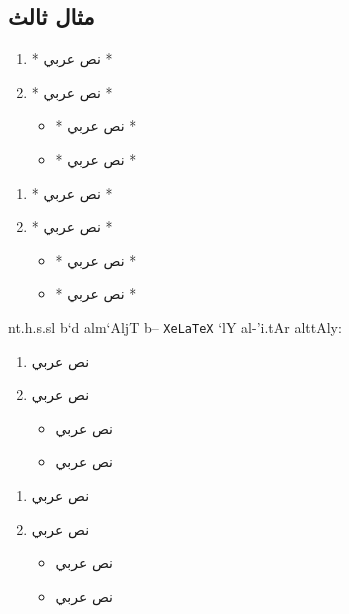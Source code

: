 \documentclass[8pt,a4paper]{article}
\begin{document}
\subsection*{مثال ثالث}
\begin{arab}
\begin{boxlis}
\begin{enumerate}
\item *\textarabic{\bantii
نص عربي }*
\item *\textarabic{\bantii
نص عربي }*
\begin{itemize}
\item *\textarabic{\bantii
نص عربي }*
\item *\textarabic{\bantii
نص عربي }*
\end{itemize}
\end{enumerate}
\begin{enumerate}
\item *\textarabic{\bantii
نص عربي }*
\item *\textarabic{\bantii
نص عربي }*
\begin{itemize}
\item *\textarabic{\bantii
نص عربي }*
\item *\textarabic{\bantii
نص عربي }*
\end{itemize}
\end{enumerate}
\end{boxlis}
nt.h.s.sl b`d alm`AljT b-- \texttt{XeLaTeX}
`lY al-'i.tAr alttAly:
\end{arab}
\begin{enumerate}
\item 
نص عربي 
\item 
نص عربي
\begin{itemize}
\item 
نص عربي
\item 
نص عربي 
\end{itemize}
\end{enumerate}
\begin{enumerate}
\item 
نص عربي 
\item 
نص عربي 
\begin{itemize}
\item 
نص عربي
\item 
نص عربي 
\end{itemize}
\end{enumerate}
\end{document}
